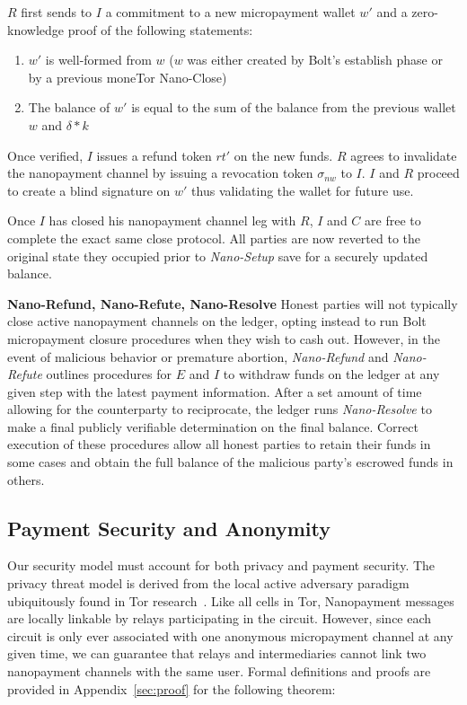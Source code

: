 $R$ first sends to $I$ a commitment to a new micropayment wallet $w'$ and a
zero-knowledge proof of the following statements:

\begin{enumerate}
\item $w'$ is well-formed from $w$ ($w$ was either created by Bolt's establish
  phase or by a previous moneTor Nano-Close)
\item The balance of $w'$ is equal to the sum of the balance from the previous
  wallet $w$ and $\delta * k$
\end{enumerate}

Once verified, $I$ issues a refund token $rt'$ on the new funds. $R$ agrees to
invalidate the nanopayment channel by issuing a revocation token $\sigma_{nw}$
to $I$. $I$ and $R$ proceed to create a blind signature on $w'$ thus validating
the wallet for future use.

Once $I$ has closed his nanopayment channel leg with $R$, $I$ and $C$ are free
to complete the exact same close protocol. All parties are now reverted to the
original state they occupied prior to \emph{Nano-Setup} save for a securely
updated balance.

\textbf{Nano-Refund, Nano-Refute, Nano-Resolve} Honest parties will not
typically close active nanopayment channels on the ledger, opting instead to run
Bolt micropayment closure procedures when they wish to cash out. However, in the
event of malicious behavior or premature abortion, \emph{Nano-Refund} and
\emph{Nano-Refute} outlines procedures for $E$ and $I$ to withdraw funds on the
ledger at any given step with the latest payment information. After a set amount
of time allowing for the counterparty to reciprocate, the ledger runs
\emph{Nano-Resolve} to make a final publicly verifiable determination on the
final balance. Correct execution of these procedures allow all honest parties to
retain their funds in some cases and obtain the full balance of the malicious
party's escrowed funds in others.

\subsection{Payment Security and Anonymity}
\label{subsec:paysecurity}
Our security model must account for both privacy and payment security. The
privacy threat model is derived from the local active adversary paradigm
ubiquitously found in Tor research~\cite{dingledine2004tor}. Like all cells in
Tor, Nanopayment messages are locally linkable by relays participating in the
circuit. However, since each circuit is only ever associated with one anonymous
micropayment channel at any given time, we can guarantee that relays and
intermediaries cannot link two nanopayment channels with the same user. Formal
definitions and proofs are provided in Appendix~\ref{sec:proof} for the
following theorem:

